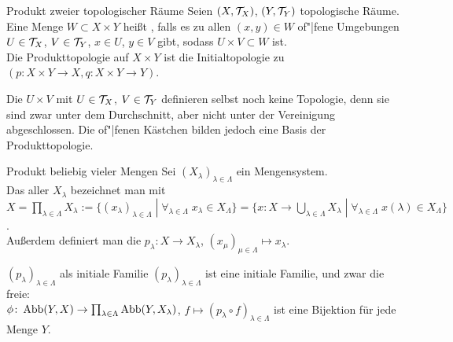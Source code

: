 \linie

\begin{Def}{Produkt zweier topologischer Räume}
    Seien $(X, \mathcal{T}_X)$, $(Y, \mathcal{T}_Y)$ topologische Räume.
    Eine Menge $W \subset X \times Y$ heißt
    , falls es zu allen $(x, y) \in W$
    of"|fene Umgebungen $U \in \mathcal{T}_X$, $V \in \mathcal{T}_Y$, $x \in U$, $y \in V$ gibt,
    sodass $U \times V \subset W$ ist. \\
    Die Produkttopologie auf $X \times Y$ ist die Initialtopologie zu
    $(p\colon X \times Y \rightarrow X, q\colon X \times Y \rightarrow Y)$.
\end{Def}

\begin{Bem}
    Die  $U \times V$ mit
    $U \in \mathcal{T}_X$, $V \in \mathcal{T}_Y$ definieren selbst noch keine Topologie, denn
    sie sind zwar unter dem Durchschnitt, aber nicht unter der Vereinigung
    abgeschlossen.
    Die of"|fenen Kästchen bilden jedoch eine Basis der Produkttopologie.
\end{Bem}

\linie

\begin{Def}{Produkt beliebig vieler Mengen}
    Sei $(X_\lambda)_{\lambda \in \Lambda}$ ein Mengensystem. \\
    Das  aller $X_\lambda$ bezeichnet man mit \\
    $X = \prod_{\lambda \in \Lambda} X_\lambda :=
    \{(x_\lambda)_{\lambda \in \Lambda} \;|\;
    \forall_{\lambda \in \Lambda}\; x_\lambda \in X_\Lambda\} =
    \{x\colon X \rightarrow \bigcup_{\lambda \in \Lambda} X_\lambda \;|\;
    \forall_{\lambda \in \Lambda}\; x(\lambda) \in X_\Lambda\}$. \\
    Außerdem definiert man die 
    $p_\lambda\colon X \rightarrow X_\lambda$,
    $(x_\mu)_{\mu \in \Lambda} \mapsto x_\lambda$.
\end{Def}

\begin{Satz}{$(p_\lambda)_{\lambda \in \Lambda}$ als initiale Familie}
    $(p_\lambda)_{\lambda \in \Lambda}$ ist eine initiale Familie,
    und zwar die freie: \\
    $\phi\colon \operatorname{Abb}(Y, X) \rightarrow
    \prod_{\lambda \in \Lambda} \operatorname{Abb}(Y, X_\lambda)$,
    $f \mapsto (p_\lambda \circ f)_{\lambda \in \Lambda}$ ist eine Bijektion
    für jede Menge $Y$.
\end{Satz}

